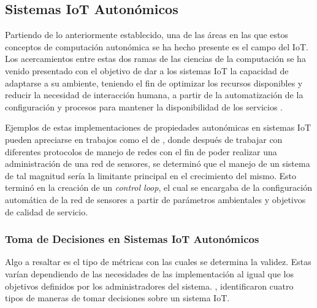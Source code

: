 \subsection{Sistemas IoT Autonómicos}

Partiendo de lo anteriormente establecido, una de las áreas en las que estos conceptos de computación autonómica se ha hecho presente es el campo del IoT. Los acercamientos entre estas dos ramas de las ciencias de la computación se ha venido presentado con el objetivo de dar a los sistemas IoT la capacidad de adaptarse a su ambiente, teniendo el fin de optimizar los recursos disponibles y reducir la necesidad de interacción humana, a partir de la automatización de la configuración y procesos para mantener la disponibilidad de los servicios \cite{Ashraf2023}.

Ejemplos de estas implementaciones de propiedades autonómicas en sistemas IoT pueden apreciarse en trabajos como el de \citeauthor{Rajan2011} \citeyear{Rajan2011}, donde después de trabajar con diferentes protocolos de manejo de redes con el fin de poder realizar una administración de una red de sensores, se determinó que el manejo de un sistema de tal magnitud sería la limitante principal en el crecimiento del mismo. Esto terminó en la creación de un \textit{control loop}, el cual se encargaba de la configuración automática de la red de sensores a partir de parámetros ambientales y objetivos de calidad de servicio.

\subsubsection{Toma de Decisiones en Sistemas IoT Autonómicos}

Algo a resaltar es el tipo de métricas con las cuales se determina la validez. Estas varían dependiendo de las necesidades de las implementación al igual que los objetivos definidos por los administradores del sistema. , identificaron cuatro tipos de maneras de tomar decisiones sobre un sistema IoT.

